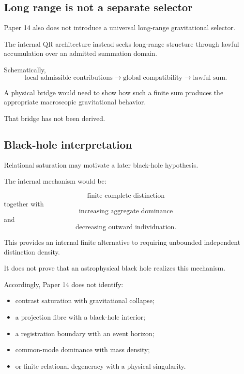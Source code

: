 \subsection{Long range is not a separate selector}

Paper 14 also does not introduce a universal long-range gravitational
selector.

The internal QR architecture instead seeks long-range structure
through lawful accumulation over an admitted summation domain.

Schematically,
\[
\text{local admissible contributions}
\longrightarrow
\text{global compatibility}
\longrightarrow
\text{lawful sum}.
\]

A physical bridge would need to show how such a finite sum produces
the appropriate macroscopic gravitational behavior.

That bridge has not been derived.

\subsection{Black-hole interpretation}

Relational saturation may motivate a later black-hole hypothesis.

The internal mechanism would be:

\[
\text{finite complete distinction}
\]
together with
\[
\text{increasing aggregate dominance}
\]
and
\[
\text{decreasing outward individuation}.
\]

This provides an internal finite alternative to requiring unbounded
independent distinction density.

It does not prove that an astrophysical black hole realizes this
mechanism.

Accordingly, Paper 14 does not identify:

\begin{itemize}

\item contrast saturation with gravitational collapse;

\item a projection fibre with a black-hole interior;

\item a registration boundary with an event horizon;

\item common-mode dominance with mass density;

\item or finite relational degeneracy with a physical singularity.

\end{itemize}

